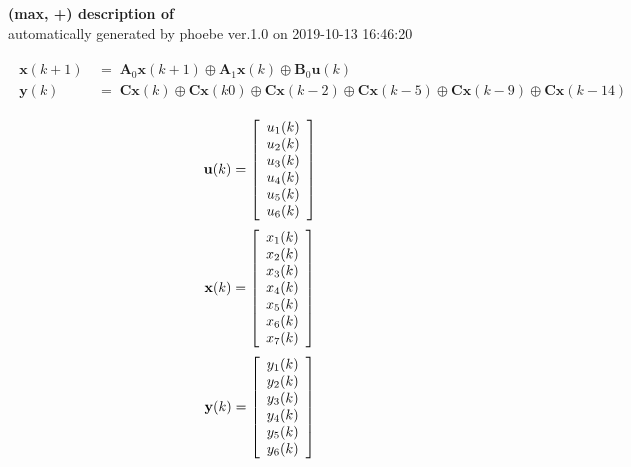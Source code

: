 \documentclass[11pt, a4paper, fleqn]{article}
\begin{document}
\noindent
\textbf{(max, +) description of} \texttt{\currfilebase} \\
automatically generated by phoebe ver.1.0 on 2019-10-13 16:46:20 

\begin{align}\begin{split}
\mathbf{x}(k+1) & \, = \; \mathbf{A}_{0}\mathbf{x}(k+1) \oplus \mathbf{A}_{1}\mathbf{x}(k) \oplus \mathbf{B}_{0}\mathbf{u}(k)\\
\mathbf{y}(k) & \, = \; \mathbf{Cx}(k) \oplus \mathbf{Cx}(k0) \oplus \mathbf{Cx}(k-2) \oplus \mathbf{Cx}(k-5) \oplus \mathbf{Cx}(k-9) \oplus \mathbf{Cx}(k-14)
\end{split}\end{align}

\begin{equation*}
\mathbf{u}(k) = 
\left[\begin{array}{*{20}c}
  u_1(k) \\
  u_2(k) \\
  u_3(k) \\
  u_4(k) \\
  u_5(k) \\
  u_6(k) \\
\end{array}\right]
\end{equation*}
\begin{equation*}
\mathbf{x}(k) = 
\left[\begin{array}{*{20}c}
  x_1(k) \\
  x_2(k) \\
  x_3(k) \\
  x_4(k) \\
  x_5(k) \\
  x_6(k) \\
  x_7(k) \\
\end{array}\right]
\end{equation*}
\begin{equation*}
\mathbf{y}(k) = 
\left[\begin{array}{*{20}c}
  y_1(k) \\
  y_2(k) \\
  y_3(k) \\
  y_4(k) \\
  y_5(k) \\
  y_6(k) \\
\end{array}\right]
\end{equation*}
\noindent\\
\end{document}

